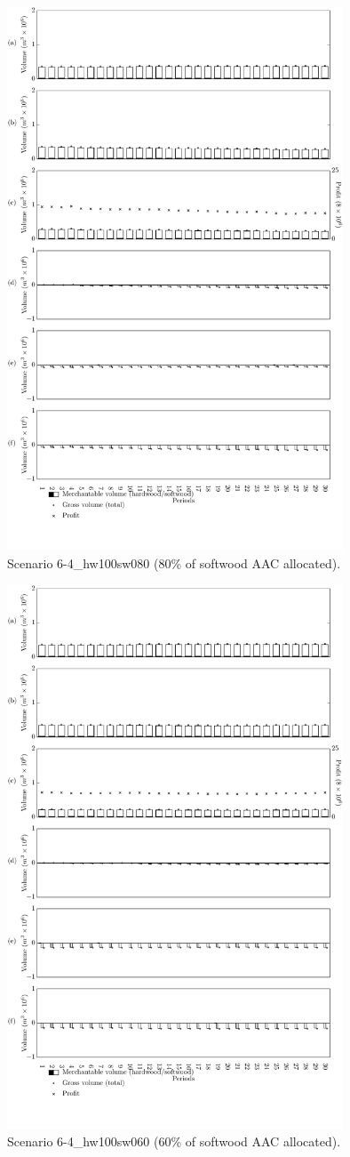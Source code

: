 \begin{figure}[h]
  \centering
  \includegraphics[width=10cm]{images/appendix/s6-4_hw100sw080}
  \caption{Scenario 6-4\_hw100sw080 (80\% of softwood AAC allocated).}
  \label{fig:s6-4_hw100sw080}
\end{figure}

\begin{figure}[h]
  \centering
  \includegraphics[width=10cm]{images/appendix/s6-4_hw100sw060}
  \caption{Scenario 6-4\_hw100sw060 (60\% of softwood AAC allocated).}
  \label{fig:s6-4_hw100sw060}
\end{figure}
